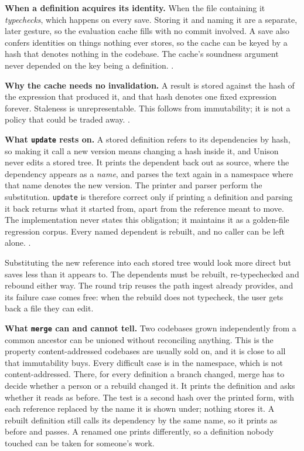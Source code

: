 \documentclass[11pt]{article}
\theoremstyle{definition}
\theoremstyle{plain}
\theoremstyle{remark}
\begin{document}
\textbf{When a definition acquires its identity.} When the file containing it \emph{typechecks},
which happens on every save. Storing it and naming it are a separate, later gesture, so the
evaluation cache fills with no commit involved. A save also confers identities on things nothing ever
stores, so the cache can be keyed by a hash that denotes nothing in the codebase. The cache's
soundness argument never depended on the key being a definition.
.

\textbf{Why the cache needs no invalidation.} A result is stored against the hash of the expression
that produced it, and that hash denotes one fixed expression forever. Staleness is unrepresentable.
This follows from immutability; it is not a policy that could be traded away. .

\textbf{What \texttt{update} rests on.} A stored definition refers to its dependencies by hash, so
making it call a new version means changing a hash inside it, and Unison never edits a stored tree.
It prints the dependent back out as source, where the dependency appears as a \emph{name}, and parses
the text again in a namespace where that name denotes the new version. The printer and parser perform
the substitution. \texttt{update} is therefore correct only if printing a definition and parsing it
back returns what it started from, apart from the reference meant to move. The implementation never
states this obligation; it maintains it as a golden-file regression corpus. Every named dependent is
rebuilt, and no caller can be left alone. .

Substituting the new reference into each stored tree would look more direct but saves less than it
appears to. The dependents must be rebuilt, re-typechecked and rebound either way. The round trip
reuses the path ingest already provides, and its failure case comes free: when the rebuild does not
typecheck, the user gets back a file they can edit.

\textbf{What \texttt{merge} can and cannot tell.} Two codebases grown independently from a common
ancestor can be unioned without reconciling anything. This is the property content-addressed
codebases are usually sold on, and it is close to all that immutability buys. Every difficult case is
in the namespace, which is not content-addressed. There, for every definition a branch changed, merge
has to decide whether a person or a rebuild changed it. It prints the definition and asks whether it
reads as before. The test is a second hash over the printed form, with each reference replaced by the
name it is shown under; nothing stores it. A rebuilt definition still calls its dependency by the
same name, so it prints as before and passes. A renamed one prints differently, so a definition
nobody touched can be taken for someone's work.
\end{document}
